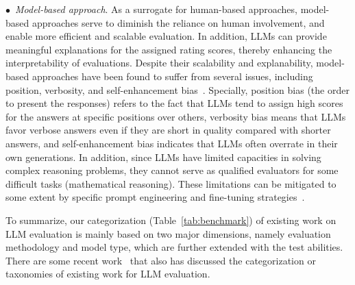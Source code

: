 $\bullet$~\emph{Model-based approach}.
As a surrogate for human-based approaches, model-based approaches serve to diminish the reliance on human involvement, and enable more efficient and scalable evaluation.
In addition, LLMs can provide meaningful explanations for the assigned rating scores, thereby enhancing the interpretability of evaluations.
Despite their scalability and explanability, model-based approaches have been found to suffer from several issues, including position, verbosity, and self-enhancement bias~\cite{Zheng-2023-arxiv-Judging}.
Specially, position bias (\ie the order to present the responses) refers to the fact that LLMs tend to assign high scores for the answers at specific positions over others, 
 verbosity bias means that LLMs favor verbose answers even if they are short in quality compared with shorter answers, and 
self-enhancement bias indicates that LLMs often overrate in their own generations. 
In addition, since LLMs have limited capacities in  solving complex reasoning problems, they cannot serve as qualified evaluators for some difficult tasks (\eg mathematical reasoning).
These limitations can be mitigated to some extent by specific prompt engineering and fine-tuning strategies~\cite{Zheng-2023-arxiv-Judging}.



To summarize, our categorization (Table~\ref{tab:benchmark}) of existing work on LLM evaluation is mainly based on two major dimensions, namely evaluation methodology and model type, which are further extended with the test abilities.
There are some recent work~\cite{Chang-2023-arxiv-A,Zhuang-2023-arxiv-Through} that also has discussed the categorization or taxonomies of existing work for LLM evaluation.